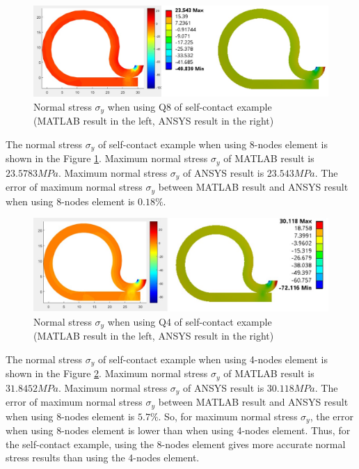\begin{figure}[H]
    \centering
    \includegraphics[scale=0.5]{Figures/sy_self_MandA.jpg}
    \decoRule
    \caption{Normal stress $\sigma_y$ when using Q8 of self-contact example \\
    (MATLAB result in the left, ANSYS result in the right)}
    \label{fig:sy_self_MandA_5}
\end{figure}
\noindent
The normal stress $\sigma_y$ of self-contact example when using 8-nodes element is shown in the Figure \ref{fig:sy_self_MandA_5}.
Maximum normal stress $\sigma_y$ of MATLAB result is $23.5783 MPa$.
Maximum normal stress $\sigma_y$ of ANSYS result is $23.543 MPa$.
The error of maximum normal stress $\sigma_y$ between MATLAB result and ANSYS result when using 8-nodes element is $0.18\%$.

\begin{figure}[H]
    \centering
    \includegraphics[scale=0.55]{Figures/chapter5/sy_q4_c.jpg}
    \decoRule
    \caption{Normal stress $\sigma_y$ when using Q4 of self-contact example \\
    (MATLAB result in the left, ANSYS result in the right)}
    \label{fig:sy_q4_c}
\end{figure}
\noindent
The normal stress $\sigma_y$ of self-contact example when using 4-nodes element is shown in the Figure \ref{fig:sy_q4_c}.
Maximum normal stress $\sigma_y$ of MATLAB result is $31.8452 MPa$.
Maximum normal stress $\sigma_y$ of ANSYS result is $30.118 MPa$.
The error of maximum normal stress $\sigma_y$ between MATLAB result and ANSYS result when using 8-nodes element is $5.7\%$.
So, for maximum normal stress $\sigma_y$, the error when using 8-nodes element is lower than when using 4-nodes element.
\vspace{0.38cm}
\newline
Thus, for the self-contact example, using the 8-nodes element gives more accurate normal stress results than using the 4-nodes element.
\newpage
